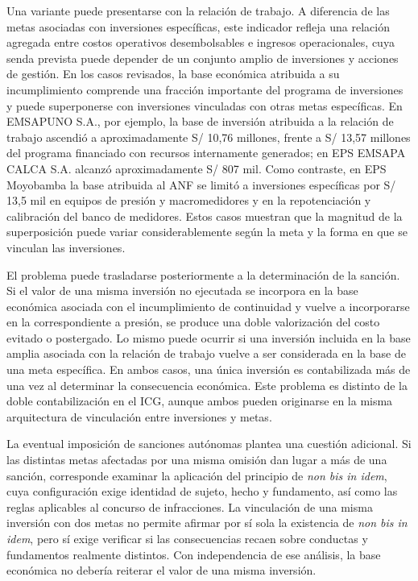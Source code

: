 Una variante puede presentarse con la relación de trabajo. A diferencia de las metas asociadas con inversiones específicas, este indicador refleja una relación agregada entre costos operativos desembolsables e ingresos operacionales, cuya senda prevista puede depender de un conjunto amplio de inversiones y acciones de gestión. En los casos revisados, la base económica atribuida a su incumplimiento comprende una fracción importante del programa de inversiones y puede superponerse con inversiones vinculadas con otras metas específicas. En EMSAPUNO S.A., por ejemplo, la base de inversión atribuida a la relación de trabajo ascendió a aproximadamente S/ 10,76 millones, frente a S/ 13,57 millones del programa financiado con recursos internamente generados; en EPS EMSAPA CALCA S.A. alcanzó aproximadamente S/ 807 mil. Como contraste, en EPS Moyobamba la base atribuida al ANF se limitó a inversiones específicas por S/ 13,5 mil en equipos de presión y macromedidores y en la repotenciación y calibración del banco de medidores. Estos casos muestran que la magnitud de la superposición puede variar considerablemente según la meta y la forma en que se vinculan las inversiones.

El problema puede trasladarse posteriormente a la determinación de la sanción. Si el valor de una misma inversión no ejecutada se incorpora en la base económica asociada con el incumplimiento de continuidad y vuelve a incorporarse en la correspondiente a presión, se produce una doble valorización del costo evitado o postergado. Lo mismo puede ocurrir si una inversión incluida en la base amplia asociada con la relación de trabajo vuelve a ser considerada en la base de una meta específica. En ambos casos, una única inversión es contabilizada más de una vez al determinar la consecuencia económica. Este problema es distinto de la doble contabilización en el ICG, aunque ambos pueden originarse en la misma arquitectura de vinculación entre inversiones y metas.

La eventual imposición de sanciones autónomas plantea una cuestión adicional. Si las distintas metas afectadas por una misma omisión dan lugar a más de una sanción, corresponde examinar la aplicación del principio de \emph{non bis in idem}, cuya configuración exige identidad de sujeto, hecho y fundamento, así como las reglas aplicables al concurso de infracciones. La vinculación de una misma inversión con dos metas no permite afirmar por sí sola la existencia de \emph{non bis in idem}, pero sí exige verificar si las consecuencias recaen sobre conductas y fundamentos realmente distintos. Con independencia de ese análisis, la base económica no debería reiterar el valor de una misma inversión.


